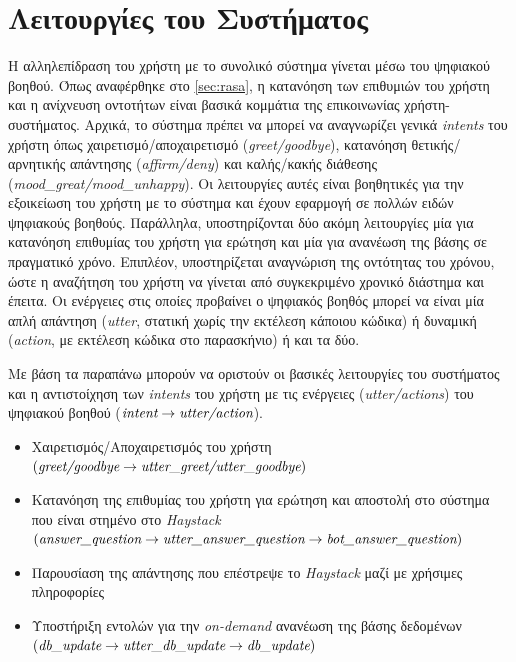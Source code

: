 \section{Λειτουργίες του Συστήματος}
Η αλληλεπίδραση του χρήστη με το συνολικό σύστημα γίνεται μέσω του ψηφιακού βοηθού. Όπως αναφέρθηκε στο \autoref{sec:rasa}, η κατανόηση των επιθυμιών του χρήστη και η ανίχνευση οντοτήτων είναι βασικά κομμάτια της επικοινωνίας χρήστη-συστήματος. Αρχικά, το σύστημα πρέπει να μπορεί να αναγνωρίζει γενικά \emph{intents} του χρήστη όπως χαιρετισμό/αποχαιρετισμό (\emph{greet/goodbye}), κατανόηση θετικής/αρνητικής απάντησης (\emph{affirm/deny}) και καλής/κακής διάθεσης (\emph{mood\_great/mood\_unhappy}). Οι λειτουργίες αυτές είναι βοηθητικές για την εξοικείωση του χρήστη με το σύστημα και έχουν εφαρμογή σε πολλών ειδών ψηφιακούς βοηθούς. Παράλληλα, υποστηρίζονται δύο ακόμη λειτουργίες μία για κατανόηση επιθυμίας του χρήστη για ερώτηση και μία για ανανέωση της βάσης σε πραγματικό χρόνο. Επιπλέον, υποστηρίζεται αναγνώριση της οντότητας του χρόνου, ώστε η αναζήτηση του χρήστη να γίνεται από συγκεκριμένο χρονικό διάστημα και έπειτα. Οι ενέργειες στις οποίες προβαίνει ο ψηφιακός βοηθός μπορεί να είναι μία απλή απάντηση (\emph{utter}, στατική χωρίς την εκτέλεση κάποιου κώδικα) ή δυναμική (\emph{action}, με εκτέλεση κώδικα στο παρασκήνιο) ή και τα δύο. 

Με βάση τα παραπάνω μπορούν να οριστούν οι βασικές λειτουργίες του συστήματος και η αντιστοίχηση των \emph{intents} του χρήστη με τις ενέργειες (\emph{utter/actions}) του ψηφιακού βοηθού ($\emph{intent} \rightarrow \emph{utter/action}$).
\begin{itemize}
    \item Χαιρετισμός/Αποχαιρετισμός του χρήστη \\
    $(\emph{greet/goodbye} \rightarrow \emph{utter\_greet/utter\_goodbye})$
    \item Κατανόηση της επιθυμίας του χρήστη για ερώτηση και αποστολή στο σύστημα που είναι στημένο στο \emph{Haystack} \\
    $(\emph{answer\_question} \rightarrow \emph{utter\_answer\_question} \rightarrow \emph{bot\_answer\_question})$
    \item Παρουσίαση της απάντησης που επέστρεψε το \emph{Haystack} μαζί με χρήσιμες πληροφορίες
    \item Υποστήριξη εντολών για την \emph{on-demand} ανανέωση της βάσης δεδομένων \\
    $(\emph{db\_update} \rightarrow \emph{utter\_db\_update} \rightarrow \emph{db\_update})$
\end{itemize}

